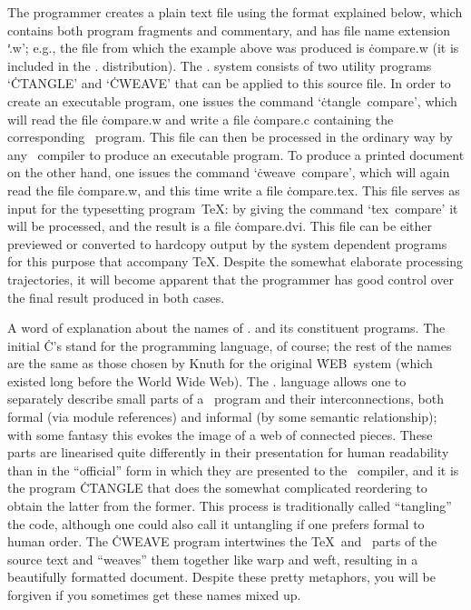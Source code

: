 The programmer creates a plain text file using the format explained below,
which contains both program fragments and commentary, and has file name
extension `\.{.w}'; e.g., the file from which the example above was produced
is \.{compare.w} (it is included in the \CWEBx. distribution). The \CWEB.
system consists of two utility programs `\.{CTANGLE}' and `\.{CWEAVE}' that
can be applied to this source file. In order to create an executable
program, one issues the command `\hbox{\.{ctangle compare}}', which will
read the file \.{compare.w} and write a file \.{compare.c} containing the
corresponding \Cee~program. This file can then be processed in the ordinary
way by any \Cee~compiler to produce an executable program. To produce a
printed document on the other hand, one issues the command `\hbox{\.{cweave
compare}}', which will again read the file \.{compare.w}, and this time
write a file \.{compare.tex}.  This file serves as input for the typesetting
program~\TeX: by giving the command `\hbox{\.{tex compare}}' it will be
processed, and the result is a file \.{compare.dvi}. This file can be either
previewed or converted to hardcopy output by the system dependent programs
for this purpose that accompany \TeX. Despite the somewhat elaborate
processing trajectories, it will become apparent that the programmer has
good control over the final result produced in both cases.

A word of explanation about the names of \CWEB. and its constituent
programs. The initial \.C's stand for the programming language, of course;
the rest of the names are the same as those chosen by Knuth for the original
\.{WEB}~system (which existed long before the World Wide Web). The \CWEB.
language allows one to separately describe small parts of a \Cee~program and
their interconnections, both formal (via module references) and informal (by
some semantic relationship); with some fantasy this evokes the image of a
web of connected pieces. These parts are linearised quite differently in
their presentation for human readability than in the ``official'' form in
which they are presented to the \Cee~compiler, and it is the program
\.{CTANGLE} that does the somewhat complicated reordering to obtain the
latter from the former. This process is traditionally called ``tangling''
the code, although one could also call it untangling if one prefers formal
to human order. The \.{CWEAVE} program intertwines the \TeX\ and \Cee~parts
of the source text and ``weaves'' them together like warp and weft,
resulting in a beautifully formatted document.  Despite these pretty
metaphors, you will be forgiven if you sometimes get these names mixed up.

